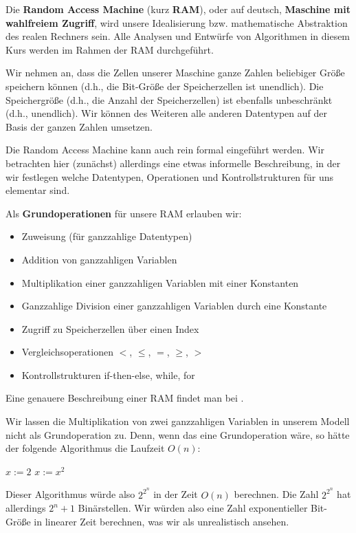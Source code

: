 \begin{bem} 
Die \textbf{Random Access Machine} (kurz \textbf{RAM}), oder auf deutsch, \textbf{Maschine mit wahlfreiem Zugriff}, wird unsere Idealisierung bzw. mathematische Abstraktion des realen Rechners sein. Alle Analysen und Entwürfe von Algorithmen in diesem Kurs werden im Rahmen der RAM durchgeführt. 

Wir nehmen an, dass die Zellen unserer Maschine ganze Zahlen beliebiger Größe speichern können (d.h., die Bit-Größe der Speicherzellen ist unendlich). Die Speichergröße (d.h., die Anzahl der Speicherzellen) ist ebenfalls unbeschränkt (d.h., unendlich). Wir können des Weiteren alle anderen Datentypen auf der Basis der ganzen Zahlen umsetzen. 

Die Random Access Machine kann auch rein formal eingeführt werden. Wir betrachten hier (zunächst) allerdings eine etwas informelle Beschreibung, in der wir festlegen welche Datentypen, Operationen und Kontrollstrukturen für uns elementar sind. 

Als \textbf{Grundoperationen} für unsere RAM erlauben wir:
%
\begin{itemize}
	\item Zuweisung (für ganzzahlige Datentypen)
	\item Addition von ganzzahligen Variablen
	\item Multiplikation einer ganzzahligen Variablen mit einer Konstanten
	\item Ganzzahlige Division einer ganzzahligen Variablen durch eine Konstante
	\item Zugriff zu Speicherzellen über einen Index
	\item Vergleichsoperationen $<$, $\le$, $=$, $\ge$, $>$ 
	\item Kontrollstrukturen if-then-else, while, for 
\end{itemize}

Eine genauere Beschreibung einer RAM findet man bei \cite[Sect.~1.3]{Lov20}.
\end{bem} 


\begin{bem} 
Wir lassen die Multiplikation von zwei ganzzahligen Variablen in unserem Modell nicht als Grundoperation zu. Denn, wenn das eine Grundoperation wäre, so hätte der folgende Algorithmus die Laufzeit $O(n)$: 

\begin{center}
	\begin{algorithmic}
		\STATE $x:=2$
		\STATE $x:=x^2$
		\ENDFOR
	\end{algorithmic}
\end{center}

Dieser Algorithmus würde also $2^{2^n}$ in der Zeit $O(n)$ berechnen. Die Zahl $2^{2^n}$ hat allerdings $2^n+1$ Binärstellen. Wir würden also eine Zahl exponentieller Bit-Größe in linearer Zeit berechnen, was wir als unrealistisch ansehen. 
\end{bem}